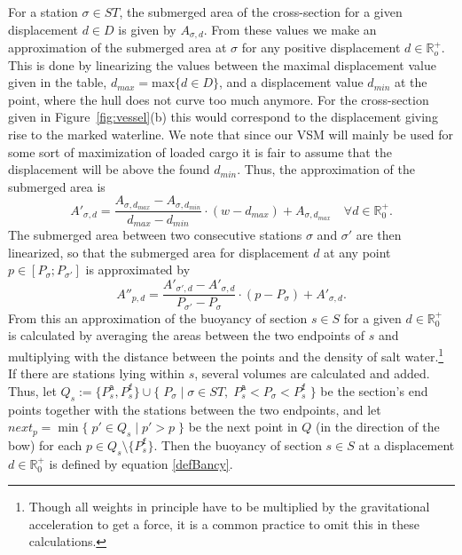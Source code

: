 \documentclass[citeauthoryear]{llncs}
\newcommand{\trt}[1]{\texttt{#1}}
\newcommand{\mi}{\mathit}
\newcommand{\set}[2]{\{\;{#1}\;|\;{#2}\;\}}
\begin{document}
For a station $\sigma\in\mi{ST}$, the submerged area of the cross-section for a given displacement $d\in D$ is given by $A_{\sigma,d}$. From these values we make an approximation of the submerged area at $\sigma$ for any positive displacement $d\in \mathbb{R}_o^+$. This is done by linearizing the values between the maximal displacement value given in the table, $d_\mi{max}=\text{max}\{d\in D\}$, and a displacement value $d_\mi{min}$ at the point, where the hull does not curve too much anymore. For the cross-section given in Figure~\ref{fig:vessel}(b) this would correspond to the displacement giving rise to the marked waterline. We note that since our VSM will mainly be used for some sort of maximization of loaded cargo it is fair to assume that the displacement will be above the found $d_\mi{min}$. Thus, the approximation of the submerged area is  
\[
A'_{\sigma,d} = \frac{A_{\sigma,d_{max}} - A_{\sigma,d_{min}}}{d_{max} - d_{min}} \cdot (\mi{w} - d_{max}) + A_{\sigma,d_{max}} \quad \forall d\in \mathbb{R}^+_0.
\]
The submerged area between two consecutive stations $\sigma$ and $\sigma'$ are then linearized, so that the submerged area for displacement $d$ at any point $p\in[P_\sigma;P_{\sigma'}]$ is approximated by
\[
A''_{p,d} = \frac{A'_{\sigma',d}-A'_{\sigma,d}}{P_{\sigma'}-P_\sigma}\cdot(p-P_\sigma) + A'_{\sigma,d}.
\]
From this an approximation of the buoyancy of section $s\in S$ for a given $d\in \mathbb{R}^+_0$ is calculated by averaging the areas between the two endpoints of $s$ and multiplying with the distance between the points and the density of salt water.\footnote{Though all weights in principle have to be multiplied by the gravitational acceleration to get a force, it is a common practice to omit this in these calculations.} If there are stations lying within $s$, several volumes are calculated and added. Thus, let $Q_s := \{P^\trt{a}_s, P^\trt{f}_s\} \cup \set{P_\sigma}{\sigma\in ST,\; P^\trt{a}_s < P_\sigma < P^\trt{f}_s}$ be the section's end points together with the stations between the two endpoints, and let $\mi{next}_p = \min\set{p' \in Q_s}{p' > p}$ be the next point in $Q$ (in the direction of the bow) for each $p \in Q_s\setminus \{P^\trt{f}_s\}$. Then the buoyancy of section $s\in S$ at a displacement $d\in\mathbb{R}^+_0$ is defined by equation \eqref{defBancy}. 
\end{document}
